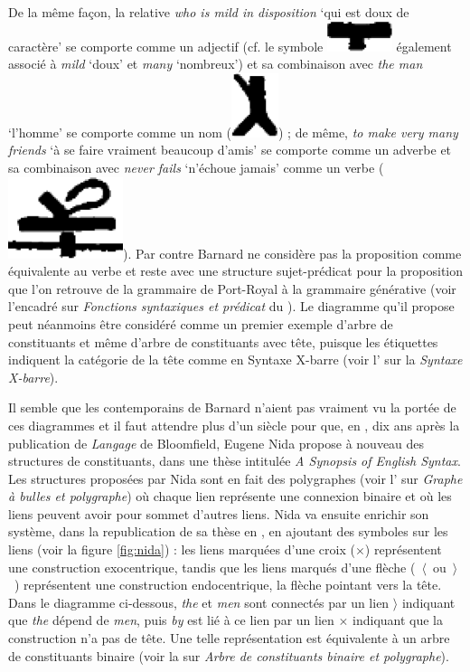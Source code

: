{    De la même façon, la relative \textit{who is mild in disposition} ‘qui est doux de caractère’ se comporte comme un adjectif (cf. le symbole \includegraphics[height=1.4ex]{figures/vol1syntaxe2-img021.png} également associé à \textit{mild} ‘doux’ et \textit{many} ‘nombreux’) et sa combinaison avec \textit{the man} ‘l’homme’ se comporte comme un nom (\includegraphics[height=1.25ex]{figures/vol1syntaxe2-img022.png}) ; de même, \textit{to make very many friends} ‘à se faire vraiment beaucoup d’amis’ se comporte comme un adverbe et sa combinaison avec \textit{never fails} ‘n’échoue jamais’ comme un verbe (\includegraphics[height=1.5ex]{figures/vol1syntaxe2-img020.png}). Par contre Barnard ne considère pas la proposition comme équivalente au verbe et reste avec une structure sujet-prédicat pour la proposition que l’on retrouve de la grammaire de Port-Royal à la grammaire générative (voir l’encadré sur \textit{Fonctions syntaxiques et prédicat} du ). Le diagramme qu’il propose peut néanmoins être considéré comme un premier exemple d’arbre de constituants et même d’arbre de constituants avec tête, puisque les étiquettes indiquent la catégorie de la tête comme en Syntaxe X-barre (voir l’ sur la \textit{Syntaxe X-barre}).
    
    Il semble que les contemporains de Barnard n’aient pas vraiment vu la portée de ces diagrammes et il faut attendre plus d’un siècle pour que, en \citeyear{nida1943morphology}, dix ans après la publication de \textit{Langage} de Bloomfield, Eugene Nida propose à nouveau des structures de constituants, dans une thèse intitulée \textit{A Synopsis of English Syntax}. Les structures proposées par Nida sont en fait des polygraphes (voir l’ sur \textit{Graphe à bulles et polygraphe}) où chaque lien représente une connexion binaire et où les liens peuvent avoir pour sommet d’autres liens. Nida va ensuite enrichir son système, dans la republication de sa thèse en \citeyear{nida1966synopsys}, en ajoutant des symboles sur les liens (voir la figure \ref{fig:nida}) : les liens marquées d’une croix ($\times$) représentent une construction exocentrique, tandis que les liens marqués d’une flèche (~$\langle$~ou~$\rangle$~) représentent une construction endocentrique, la flèche pointant vers la tête. Dans le diagramme ci-dessous, \textit{the} et \textit{men} sont connectés par un lien $\rangle$ indiquant que \textit{the} dépend de \textit{men}, puis \textit{by} est lié à ce lien par un lien $\times$ indiquant que la construction n’a pas de tête. Une telle représentation est équivalente à un arbre de constituants binaire (voir la  sur \textit{Arbre de constituants binaire et polygraphe}).

}
